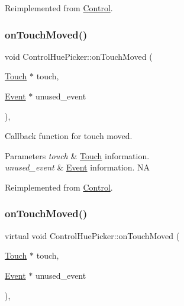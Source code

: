 Reimplemented from \hyperlink{classControl_a0cf2e20cea5b57b263e965be4a19ab52}{Control}.

\mbox{\label{classControlHuePicker_a09874584a6a21355d830546ee3b0751d}} 
\subsubsection{\texorpdfstring{on\+Touch\+Moved()}{onTouchMoved()}\hspace{0.1cm}{\footnotesize\ttfamily [1/2]}}
{\footnotesize\ttfamily void Control\+Hue\+Picker\+::on\+Touch\+Moved (\begin{DoxyParamCaption}\item[{\hyperlink{classTouch}{Touch} $\ast$}]{touch,  }\item[{\hyperlink{classEvent}{Event} $\ast$}]{unused\+\_\+event }\end{DoxyParamCaption})\hspace{0.3cm}{\ttfamily [override]}, {\ttfamily [virtual]}}

Callback function for touch moved.


\begin{DoxyParams}{Parameters}
{\em touch} & \hyperlink{classTouch}{Touch} information. \\
\hline
{\em unused\+\_\+event} & \hyperlink{classEvent}{Event} information.  NA \\
\hline
\end{DoxyParams}


Reimplemented from \hyperlink{classControl_a26d2e6af053319dc605949678f726622}{Control}.

\mbox{\label{classControlHuePicker_ae287e5f1cd8856c76475825549f098d8}} 
\subsubsection{\texorpdfstring{on\+Touch\+Moved()}{onTouchMoved()}\hspace{0.1cm}{\footnotesize\ttfamily [2/2]}}
{\footnotesize\ttfamily virtual void Control\+Hue\+Picker\+::on\+Touch\+Moved (\begin{DoxyParamCaption}\item[{\hyperlink{classTouch}{Touch} $\ast$}]{touch,  }\item[{\hyperlink{classEvent}{Event} $\ast$}]{unused\+\_\+event }\end{DoxyParamCaption})\hspace{0.3cm}{\ttfamily [override]}, {\ttfamily [virtual]}}

